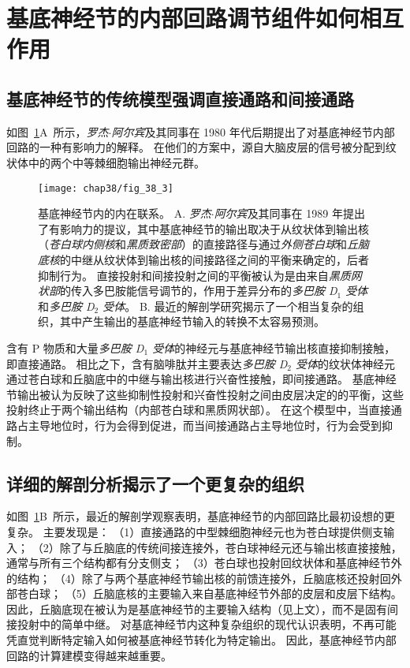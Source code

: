 \section{基底神经节的内部回路调节组件如何相互作用}

\subsection{基底神经节的传统模型强调直接通路和间接通路}

如图~\ref{fig:38_3}A~所示，\textit{罗杰$\cdot$阿尔宾}及其同事在 1980 年代后期提出了对基底神经节内部回路的一种有影响力的解释。
在他们的方案中，源自大脑皮层的信号被分配到纹状体中的两个中等棘细胞输出神经元群。


\begin{figure}[htbp]
	\centering
	\texttt{[image: chap38/fig\_38\_3]}
	\caption{基底神经节内的内在联系。
		A. \textit{罗杰$\cdot$阿尔宾}及其同事在 1989 年提出了有影响力的提议，其中基底神经节的输出取决于从纹状体到输出核（\textit{苍白球内侧核}和\textit{黑质致密部}）的直接路径与通过\textit{外侧苍白球}和\textit{丘脑底核}的中继从纹状体到输出核的间接路径之间的平衡来确定的，后者抑制行为。
		直接投射和间接投射之间的平衡被认为是由来自\textit{黑质网状部}的传入多巴胺能信号调节的，作用于差异分布的\textit{多巴胺 D$_1$ 受体}和\textit{多巴胺 D$_2$ 受体}。
		B. 最近的解剖学研究揭示了一个相当复杂的组织，其中产生输出的基底神经节输入的转换不太容易预测。}
	\label{fig:38_3}
\end{figure}


含有 P 物质和大量\textit{多巴胺 D$_1$ 受体}的神经元与基底神经节输出核直接抑制接触，即直接通路。
相比之下，含有脑啡肽并主要表达\textit{多巴胺 D$_2$ 受体}的纹状体神经元通过苍白球和丘脑底中的中继与输出核进行兴奋性接触，即间接通路。
基底神经节输出被认为反映了这些抑制性投射和兴奋性投射之间由皮层决定的的平衡，这些投射终止于两个输出结构（内部苍白球和黑质网状部）。
在这个模型中，当直接通路占主导地位时，行为会得到促进，而当间接通路占主导地位时，行为会受到抑制。



\subsection{详细的解剖分析揭示了一个更复杂的组织}

如图~\ref{fig:38_3}B~所示，最近的解剖学观察表明，基底神经节的内部回路比最初设想的更复杂。
主要发现是：
（1）直接通路的中型棘细胞神经元也为苍白球提供侧支输入； 
（2）除了与丘脑底的传统间接连接外，苍白球神经元还与输出核直接接触，通常与所有三个结构都有分支侧支；
（3）苍白球也投射回纹状体和基底神经节外的结构；
（4）除了与两个基底神经节输出核的前馈连接外，丘脑底核还投射回外部苍白球； 
（5）丘脑底核的主要输入来自基底神经节外部的皮层和皮层下结构。
因此，丘脑底现在被认为是基底神经节的主要输入结构（见上文），而不是固有间接投射中的简单中继。
对基底神经节内这种复杂组织的现代认识表明，不再可能凭直觉判断特定输入如何被基底神经节转化为特定输出。
因此，基底神经节内部回路的计算建模变得越来越重要。


